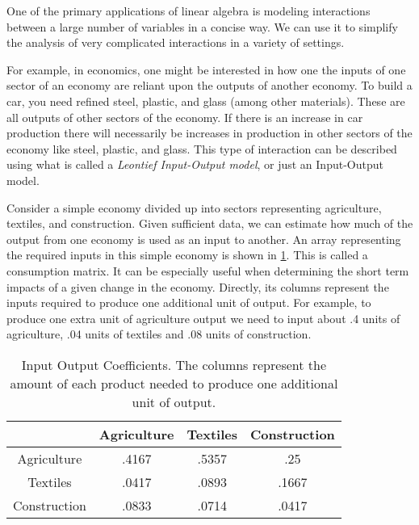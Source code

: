 \label{Leontief}


One of the primary applications of linear algebra is modeling interactions between a large number of variables in a concise way.
We can use it to simplify the analysis of very complicated interactions in a variety of settings.

For example, in economics, one might be interested in how one the inputs of one sector of an economy are reliant upon the outputs of another economy.
To build a car, you need refined steel, plastic, and glass (among other materials).
These are all outputs of other sectors of the economy.
If there is an increase in car production there will necessarily be increases in production in other sectors of the economy like steel, plastic, and glass.
This type of interaction can be described using what is called a \emph{Leontief Input-Output model}, or just an Input-Output model.

Consider a simple economy divided up into sectors representing agriculture, textiles, and construction.
Given sufficient data, we can estimate how much of the output from one economy is used as an input to another.
An array representing the required inputs in this simple economy is shown in \ref{IOCoefTable}.
This is called a consumption matrix.
It can be especially useful when determining the short term impacts of a given change in the economy.
Directly, its columns represent the inputs required to produce one additional unit of output.
For example, to produce one extra unit of agriculture output we need to input about .4 units of agriculture, .04 units of textiles and .08 units of construction.

\begin{table}
\begin{center}
\begin{tabular}{|c|c|c|c|}
\hline
& Agriculture & Textiles & Construction \\ \hline
Agriculture & .4167 & .5357 & .25 \\ \hline
Textiles & .0417 & .0893 & .1667 \\ \hline
Construction & .0833 & .0714 & .0417 \\ \hline
\end{tabular}
\caption{Input Output Coefficients.
The columns represent the amount of each product needed to produce one additional unit of output.}
\label{IOCoefTable}
\end{center}
\end{table}

